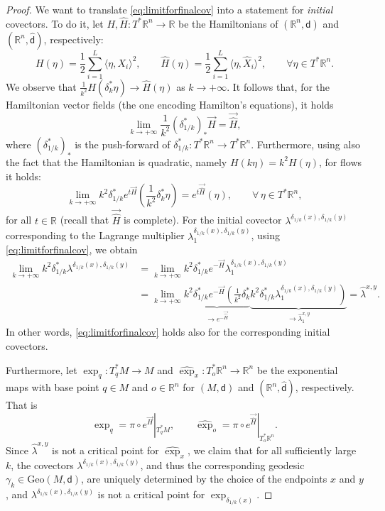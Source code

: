 \documentclass[11pt,a4paper]{article}
\theoremstyle{plain}
\theoremstyle{definition}
\theoremstyle{remark}
\numberwithin{equation}{section}
\newcommand{\R}{\mathbb{R}} %
\newcommand{\Geo}{\mathrm{Geo}}
\newcommand{\sfd}{\mathsf d}
\begin{document}
\begin{proof}
We want to translate \eqref{eq:limitforfinalcov} into a statement for \emph{initial} covectors. To do it, let $H,\hat{H}:T^*\R^n\to \R$ be the Hamiltonians of $(\R^n,\sfd)$ and $(\R^n,\hat{\sfd})$, respectively:
\begin{equation}
H(\eta) = \frac{1}{2}\sum_{i=1}^L \langle \eta, X_i\rangle^2, \qquad \hat{H}(\eta) = \frac{1}{2}\sum_{i=1}^L \langle \eta , \hat{X}_i\rangle^2, \qquad \forall \eta \in T^*\R^n.
\end{equation}
We observe that $\tfrac{1}{k^2} H(\delta_{k}^*\eta) \to \hat{H}(\eta)$ as $k\to +\infty$. It follows that, for the Hamiltonian vector fields (the one encoding Hamilton's equations), it holds
\begin{equation}
\lim_{k\to +\infty} \frac{1}{k^2} (\delta_{1/k}^*)_* \vec{H} = \vec{\hat{H}},
\end{equation}
where $(\delta_{1/k}^*)_*$ is the push-forward of $\delta_{1/k}^*: T^*\R^n\to T^*\R^n$. Furthermore, using also the fact that the Hamiltonian is quadratic, namely $H(k \eta) =k^2 H(\eta)$, for flows it holds:
\begin{equation}
\lim_{k\to +\infty} k^2\delta_{1/k}^* e^{t\vec{H}}\left(\frac{1}{k^2} \delta_{k}^*\eta\right) = e^{t\vec{\hat{H}}}(\eta), \qquad \forall\, \eta\in T^*\R^n,
\end{equation}
for all $t \in \R$ (recall that $\vec{\hat{H}}$ is complete). For the initial covector $\lambda^{\delta_{1/k}(x),\delta_{1/k}(y)}$ corresponding to the Lagrange multiplier $\lambda_1^{\delta_{1/k}(x),\delta_{1/k}(y)}$, using \eqref{eq:limitforfinalcov}, we obtain
\begin{align}\label{eq:weknow}
\lim_{k\to +\infty} k^2 \delta_{1/k}^* \lambda^{\delta_{1/k}(x),\delta_{1/k}(y)} & = \lim_{k\to +\infty}
 k^2 \delta_{1/k}^* e^{-\vec{H}} \lambda^{\delta_{1/k}(x),\delta_{1/k}(y)}_1 \\
& = \lim_{k\to +\infty}\underbrace{k^2 \delta_{1/k}^* e^{-\vec{H}} \left( \frac{1}{k^2} \delta_{k}^*\right.}_{\to e^{-\vec{\hat{H}}}} \underbrace{\left.k^2 \delta_{1/k}^*\lambda^{\delta_{1/k}(x),\delta_{1/k}(y)}_1\right)}_{\to \hat{\lambda}^{x,y}_1} = \hat{\lambda}^{x,y}.
\end{align}
In other words, \eqref{eq:limitforfinalcov} holds also for the corresponding initial covectors.

Furthermore, let $\exp_q: T_q^*M\to M$ and $\widehat{\exp}_x : T_o^*\R^n \to \R^n$ be the exponential maps with base point $q\in M$ and $o\in \R^n$ for $(M,\sfd)$ and $(\R^n,\hat{\sfd})$, respectively. That is
\begin{equation}
\exp_q = \pi \circ e^{\vec{H}}|_{T_q^*M}, \qquad \widehat{\exp}_o = \pi\circ e^{\vec{\hat{H}}}|_{T_o^*\R^n}.
\end{equation}
Since $\hat{\lambda}^{x,y}$ is not a critical point for $\widehat{\exp}_x$, we claim that for all sufficiently large $k$, the covectors $\lambda^{\delta_{1/k}(x),\delta_{1/k}(y)}$, and thus the corresponding geodesic $\gamma_k\in \Geo(M,\sfd)$, are uniquely determined by the choice of the endpoints $x$ and $y$, and $\lambda^{\delta_{1/k}(x),\delta_{1/k}(y)}$ is not a critical point for $\exp_{\delta_{1/k}(x)}$. 


\end{proof}
\end{document}
